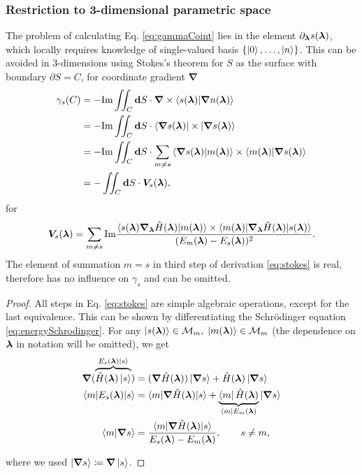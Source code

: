 \subsubsection{Restriction to 3-dimensional parametric space}
The problem of calculating Eq. \ref{eq:gammaCoint} lies in the element $\partial_{\bm\lambda} s({\bm\lambda})$, which locally requires knowledge of single-valued basis $\{\ket{0},\dots, \ket{n}\}$. This can be avoided in 3-dimensions using Stokes's theorem for $S$ as the surface with boundary $\partial S=C$, for coordinate gradient $\bm \nabla$
\begin{equation}
    \begin{split}
        \gamma_s(C) &= -\textrm{Im} \iint_C \bm{\mathrm{d}} S \cdot \bm \nabla \times \braket{s({\bm\lambda})|\bm \nabla n({\bm\lambda})}\\
         &= -\textrm{Im} \iint_C \bm{\mathrm{d}} S \cdot \braket{\bm \nabla s({\bm\lambda})|\times|\bm \nabla s({\bm\lambda})}\\
        &= -\textrm{Im} \iint_C \bm{\mathrm{d}} S \cdot \sum_{m\neq s} \braket{\bm \nabla s({\bm\lambda})|m({\bm\lambda})}\times \braket{m({\bm\lambda})|\bm \nabla s({\bm\lambda})}\\
        &= -\iint_C \bm{\mathrm{d}} S \cdot \bm V_s({\bm\lambda}),
    \end{split}
    \label{eq:stokes}
\end{equation}
for 
\begin{equation}
    \bm V_s({\bm\lambda}) = \sum_{m\neq s} \textrm{Im} \frac{
            \braket{s({\bm\lambda})\bm \nabla_{\bm\lambda} \hat{H}({\bm\lambda}) |m({\bm\lambda})}\times \braket{m({\bm\lambda})|\bm \nabla_{\bm\lambda} \hat{H}({\bm\lambda})|s({\bm\lambda})}    
             }{
(E_m({\bm\lambda})-E_s({\bm\lambda}))^2
             }.
\end{equation}
The element of summation $m=s$ in third step of derivation \ref{eq:stokes} is real, therefore has no influence on $\gamma_s$ and can be omitted. 

\begin{proof}
 All steps in Eq. \ref{eq:stokes} are simple algebraic operations, except for the last equivalence. This can be shown by differentiating the Schr\"odinger equation \ref{eq:energySchrodinger}. For any $\ket{s({\bm\lambda})}\in \mathcal{M}_m,\;\ket{m({\bm\lambda})}\in \mathcal{M}_m$ (the dependence on ${\bm\lambda}$ in notation will be omitted), we get
\begin{equation}
    \begin{split}
        \bm \nabla (\overbrace{\hat{H}({\bm\lambda})\ket{s}}^{E_s({\bm\lambda})\ket{s}})&= (\bm\nabla \hat{H}({\bm\lambda}))\ket{\bm \nabla s} +\hat{H}({\bm\lambda}) \ket{\bm \nabla s}\\
        \braket{m|E_s({\bm\lambda})|s}&= \braket{m|\bm \nabla \hat{H}({\bm\lambda})| s}+ \underbrace{\bra{m} \hat{H}({\bm\lambda})}_{\bra{m} E_m({\bm\lambda})} |\bm\nabla s\rangle \\
        \braket{m|\bm \nabla s}&=
        \frac{\braket{m|\bm \nabla \hat{H}({\bm\lambda}) |s}}
        { E_s({\bm\lambda})-E_m({\bm\lambda})}, \qquad s\neq m,
    \end{split}
    \label{eq:mgradn_proof}
\end{equation}

where we used $\ket{\bm \nabla s}\coloneqq\bm \nabla \ket{ s}$.    
\end{proof} 

